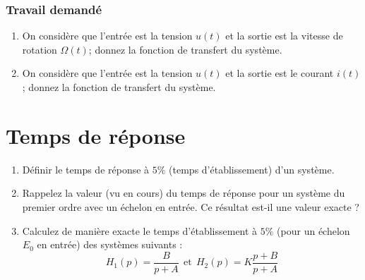 \subsubsection{Travail demandé}
\begin{enumerate}
\item On consid\`ere que l'entr\'ee est la tension $u(t)$ et la sortie est la vitesse de rotation $\Omega(t)$; donnez la fonction de transfert du syst\`eme.
\item On consid\`ere que l'entr\'ee est la tension $u(t)$ et la sortie est le courant $i(t)$; donnez la fonction de transfert du syst\`eme.
\end{enumerate}

\correction{ %
\begin{enumerate}
\item \[ \frac{\Omega(p)}{U(p)}=\frac{\frac{K}{K^2+Rf}}{1+\frac{RJ+Lf}{K^2+Rf}p+\frac{LJ}{K^2+Rf}p^2} \]
\item \[\frac{I(p)}{U(p)}=\frac{f}{K^2+Rf}\frac{1+\frac{J}{f}p}{1+\frac{RJ+Lf}{K^2+Rf}p+\frac{LJ}{K^2+Rf}p^2}\]
\end{enumerate}
}
\newpage



\newpage
\section{Temps de réponse}


\begin{enumerate}
\item D\'efinir le temps de r\'eponse \`a $5\%$ (temps d'\'etablissement) d'un syst\`eme. 
\item Rappelez la valeur (vu en cours) du temps de r\'eponse pour un syst\`eme du premier ordre avec un \'echelon en entr\'ee. Ce r\'esultat est-il une valeur exacte ?
\item Calculez de mani\`ere exacte le temps d'\'etablissement \`a $5\%$ (pour un \'echelon $E_0$ en entr\'ee) des syst\`emes suivants :\\
\[H_1(p)= \frac{B}{p+A} \ \ \textrm{et} \ \ H_2(p)=  K\frac{p+B}{p+A}\]
\end{enumerate}

